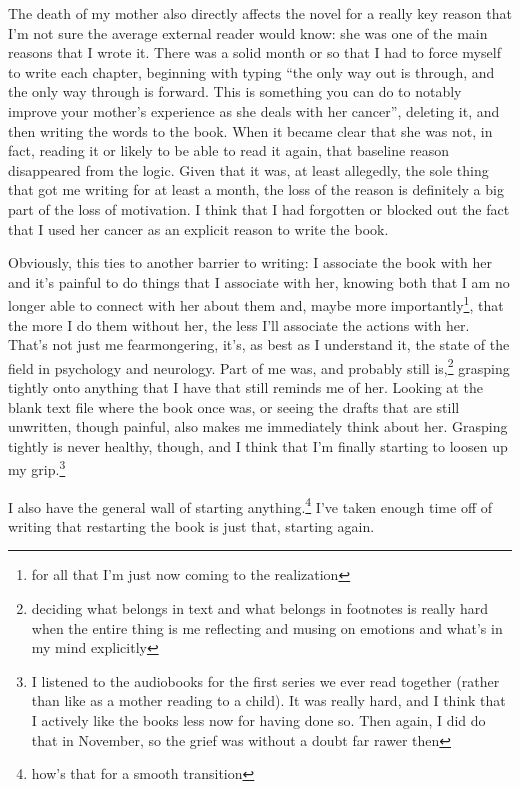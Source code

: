 \documentclass[12pt]{article}[titlepage]
\newcommand{\say}[1]{``#1''}
\renewcommand{\,}{\textsuperscript{,}}
\begin{document}
The death of my mother also directly affects the novel for a really key reason that I'm not sure the average external reader would know: she was one of the main reasons that I wrote it.  
There was a solid month or so that I had to force myself to write each chapter, beginning with typing \say{the only way out is through, and the only way through is forward. This is something you can do to notably improve your mother's experience as she deals with her cancer}, deleting it, and then writing the words to the book.  
When it became clear that she was not, in fact, reading it or likely to be able to read it again, that baseline reason disappeared from the logic.  
Given that it was, at least allegedly, the sole thing that got me writing for at least a month, the loss of the reason is definitely a big part of the loss of motivation.  
I think that I had forgotten or blocked out the fact that I used her cancer as an explicit reason to write the book.

Obviously, this ties to another barrier to writing: I associate the book with her and it's painful to do things that I associate with her, knowing both that I am no longer able to connect with her about them and, maybe more importantly\footnote{for all that I'm just now coming to the realization}, that the more I do them without her, the less I'll associate the actions with her.  
That's not just me fearmongering, it's, as best as I understand it, the state of the field in psychology and neurology.  
Part of me was, and probably still is,\footnote{deciding what belongs in text and what belongs in footnotes is really hard when the entire thing is me reflecting and musing on emotions and what's in my mind explicitly} grasping tightly onto anything that I have that still reminds me of her.  
Looking at the blank text file where the book once was, or seeing the drafts that are still unwritten, though painful, also makes me immediately think about her.  
Grasping tightly is never healthy, though, and I think that I'm finally starting to loosen up my grip.\footnote{I listened to the audiobooks for the first series we ever read together (rather than like as a mother reading to a child). It was really hard, and I think that I actively like the books less now for having done so. Then again, I did do that in November, so the grief was without a doubt far rawer then}

I also have the general wall of starting anything.\footnote{how's that for a smooth transition}  
I've taken enough time off of writing that restarting the book is just that, starting again.
\end{document}
